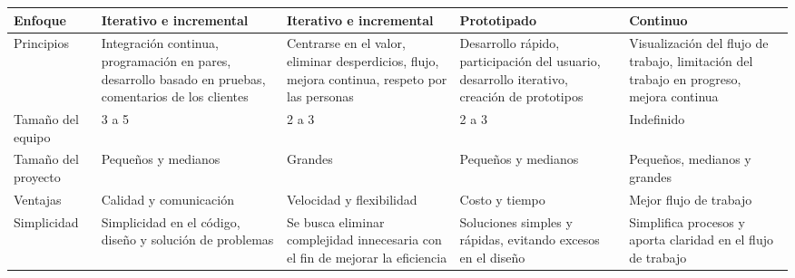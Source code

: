 \begin{longtable}{|p{3cm}|p{2.5cm}|p{2.5cm}|p{2.5cm}|p{2.5cm}|}
    \hline \hline
    \endlastfoot
    Enfoque                                        & Iterativo e incremental                                                                                & Iterativo e incremental                                                                        & Prototipado                                                                                & Continuo                                                                                \\\hline
    Principios                                     & Integración continua, programación en pares, desarrollo basado en pruebas, comentarios de los clientes & Centrarse en el valor, eliminar desperdicios, flujo, mejora continua, respeto por las personas & Desarrollo rápido, participación del usuario, desarrollo iterativo, creación de prototipos & Visualización del flujo de trabajo, limitación del trabajo en progreso, mejora continua \\\hline
    Tamaño del equipo                              & 3 a 5                                                                                                  & 2 a 3                                                                                          & 2 a 3                                                                                      & Indefinido                                                                              \\\hline
    Tamaño del proyecto                            & Pequeños y medianos                                                                                    & Grandes                                                                                        & Pequeños y medianos                                                                        & Pequeños, medianos y grandes                                                            \\\hline
    Ventajas                                       & Calidad y comunicación                                                                                 & Velocidad y flexibilidad                                                                       & Costo y tiempo                                                                             & Mejor flujo de trabajo                                                                  \\\hline
    Simplicidad                                    & Simplicidad en el código, diseño y solución de problemas                                               & Se busca eliminar complejidad innecesaria con el fin de mejorar la eficiencia                  & Soluciones simples y rápidas, evitando excesos en el diseño                                & Simplifica procesos y aporta claridad en el flujo de trabajo                            \\\hline

\end{longtable}
